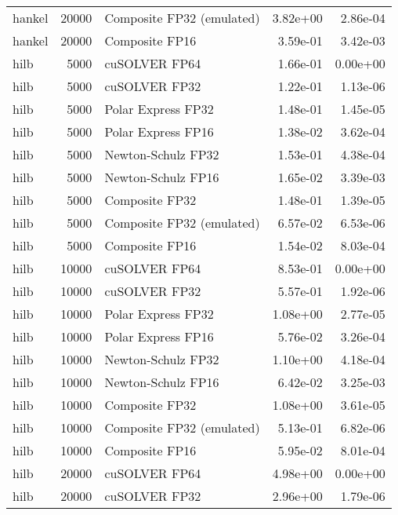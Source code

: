 \begin{table}
\begin{tabular}{lrlrr}
   hankel & 20000 & Composite FP32 (emulated) &  3.82e+00 &        2.86e-04 \\
   hankel & 20000 &            Composite FP16 &  3.59e-01 &        3.42e-03 \\
     hilb &  5000 &             cuSOLVER FP64 &  1.66e-01 &        0.00e+00 \\
     hilb &  5000 &             cuSOLVER FP32 &  1.22e-01 &        1.13e-06 \\
     hilb &  5000 &        Polar Express FP32 &  1.48e-01 &        1.45e-05 \\
     hilb &  5000 &        Polar Express FP16 &  1.38e-02 &        3.62e-04 \\
     hilb &  5000 &        Newton-Schulz FP32 &  1.53e-01 &        4.38e-04 \\
     hilb &  5000 &        Newton-Schulz FP16 &  1.65e-02 &        3.39e-03 \\
     hilb &  5000 &            Composite FP32 &  1.48e-01 &        1.39e-05 \\
     hilb &  5000 & Composite FP32 (emulated) &  6.57e-02 &        6.53e-06 \\
     hilb &  5000 &            Composite FP16 &  1.54e-02 &        8.03e-04 \\
     hilb & 10000 &             cuSOLVER FP64 &  8.53e-01 &        0.00e+00 \\
     hilb & 10000 &             cuSOLVER FP32 &  5.57e-01 &        1.92e-06 \\
     hilb & 10000 &        Polar Express FP32 &  1.08e+00 &        2.77e-05 \\
     hilb & 10000 &        Polar Express FP16 &  5.76e-02 &        3.26e-04 \\
     hilb & 10000 &        Newton-Schulz FP32 &  1.10e+00 &        4.18e-04 \\
     hilb & 10000 &        Newton-Schulz FP16 &  6.42e-02 &        3.25e-03 \\
     hilb & 10000 &            Composite FP32 &  1.08e+00 &        3.61e-05 \\
     hilb & 10000 & Composite FP32 (emulated) &  5.13e-01 &        6.82e-06 \\
     hilb & 10000 &            Composite FP16 &  5.95e-02 &        8.01e-04 \\
     hilb & 20000 &             cuSOLVER FP64 &  4.98e+00 &        0.00e+00 \\
     hilb & 20000 &             cuSOLVER FP32 &  2.96e+00 &        1.79e-06 \\

\end{tabular}
\end{table}
